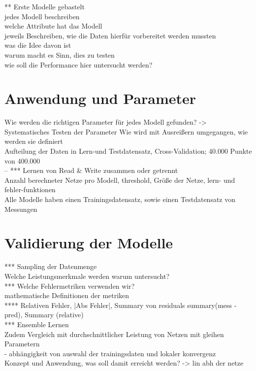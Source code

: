 \documentclass[
	12pt,
	a4paper,
	BCOR10mm,
	DIV14,
	listof=totoc,
	bibliography=totoc,
	headsepline
]{scrreprt}
\begin{document}
** Erste Modelle gebastelt\\
jedes Modell beschreiben\\
welche Attribute hat das Modell\\
jeweils Beschreiben, wie die Daten hierfür vorbereitet werden mussten\\
was die Idee davon ist\\
warum macht es Sinn, dies zu testen\\
wie soll die Performance hier untersucht werden?\\

\section{Anwendung und Parameter}
Wie werden die richtigen Parameter für jedes Modell gefunden? -> Systematisches Testen der Parameter
Wie wird mit Ausreißern umgegangen, wie werden sie definiert\\
Aufteilung der Daten in Lern-und Testdatensatz, Cross-Validation; 40.000 Punkte von 400.000\\ 
-- *** Lernen von Read \& Write zusammen oder getrennt\\

Anzahl berechneter Netze pro Modell, threshold, Größe der Netze, lern- und fehler-funktionen\\


Alle Modelle haben einen Trainingsdatensatz, sowie einen Testdatensatz von Messungen 

\section{Validierung der Modelle}
*** Sampling der Datenmenge\\
Welche Leistungsmerkmale werden warum untersucht?\\
*** Welche Fehlermetriken verwenden wir?\\
mathematische Definitionen der metriken\\
**** Relativen Fehler, |Abs Fehler|, Summary von residuals summary(mess - pred), Summary (relative)\\
*** Ensemble Lernen\\
Zudem Vergleich mit durchschnittlicher Leistung von Netzen mit gleihen Parametern\\
- abhängigkeit von auswahl der trainingsdaten und lokaler konvergenz\\
Konzept und Anwendung, was soll damit erreicht werden? -> lin abh der netze\\
\end{document}
